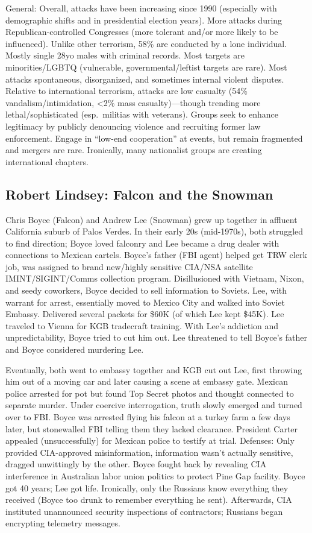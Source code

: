\documentclass[
]{article}
\begin{document}
General: Overall, attacks have been increasing since 1990 (especially
with demographic shifts and in presidential election years). More
attacks during Republican-controlled Congresses (more tolerant and/or
more likely to be influenced). Unlike other terrorism, 58\% are
conducted by a lone individual. Mostly single 28yo males with criminal
records. Most targets are minorities/LGBTQ (vulnerable,
governmental/leftist targets are rare). Most attacks spontaneous,
disorganized, and sometimes internal violent disputes. Relative to
international terrorism, attacks are low casualty (54\%
vandalism/intimidation, \textless2\% mass casualty)---though trending
more lethal/sophisticated (esp.~militias with veterans). Groups seek to
enhance legitimacy by publicly denouncing violence and recruiting former
law enforcement. Engage in ``low-end cooperation'' at events, but remain
fragmented and mergers are rare. Ironically, many nationalist groups are
creating international chapters.

\hypertarget{robert-lindsey-falcon-and-the-snowman}{%
\subsection{Robert Lindsey: Falcon and the
Snowman}\label{robert-lindsey-falcon-and-the-snowman}}

Chris Boyce (Falcon) and Andrew Lee (Snowman) grew up together in
affluent California suburb of Palos Verdes. In their early 20s
(mid-1970s), both struggled to find direction; Boyce loved falconry and
Lee became a drug dealer with connections to Mexican cartels. Boyce's
father (FBI agent) helped get TRW clerk job, was assigned to brand
new/highly sensitive CIA/NSA satellite IMINT/SIGINT/Comms collection
program. Disillusioned with Vietnam, Nixon, and seedy coworkers, Boyce
decided to sell information to Soviets. Lee, with warrant for arrest,
essentially moved to Mexico City and walked into Soviet Embassy.
Delivered several packets for \$60K (of which Lee kept \$45K). Lee
traveled to Vienna for KGB tradecraft training. With Lee's addiction and
unpredictability, Boyce tried to cut him out. Lee threatened to tell
Boyce's father and Boyce considered murdering Lee.

Eventually, both went to embassy together and KGB cut out Lee, first
throwing him out of a moving car and later causing a scene at embassy
gate. Mexican police arrested for pot but found Top Secret photos and
thought connected to separate murder. Under coercive interrogation,
truth slowly emerged and turned over to FBI. Boyce was arrested flying
his falcon at a turkey farm a few days later, but stonewalled FBI
telling them they lacked clearance. President Carter appealed
(unsuccessfully) for Mexican police to testify at trial. Defenses: Only
provided CIA-approved misinformation, information wasn't actually
sensitive, dragged unwittingly by the other. Boyce fought back by
revealing CIA interference in Australian labor union politics to protect
Pine Gap facility. Boyce got 40 years; Lee got life. Ironically, only
the Russians know everything they received (Boyce too drunk to remember
everything he sent). Afterwards, CIA instituted unannounced security
inspections of contractors; Russians began encrypting telemetry
messages.
\end{document}
